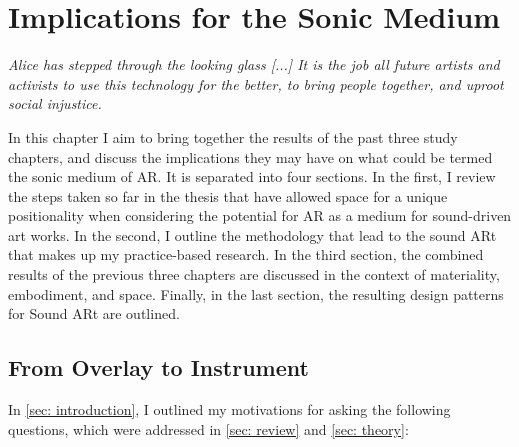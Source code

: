 \chapter{Implications for the Sonic Medium}
\label{sec: discussion}
\epigraph{\emph{Alice has stepped through the looking glass [...] It is the job all future artists and activists to use this technology for the better, to bring people together, and uproot social injustice.}}{\citep[]{skwarek2018}}
In this chapter I aim to bring together the results of the past three study chapters, and discuss the implications they may have on what could be termed the sonic medium of AR. It is separated into four sections. In the first, I review the steps taken so far in the thesis that have allowed space for a unique positionality when considering the potential for AR as a medium for sound-driven art works. In the second, I outline the methodology that lead to the sound ARt that makes up my practice-based research. In the third section, the combined results of the previous three chapters are discussed in the context of materiality, embodiment, and space. Finally, in the last section, the resulting design patterns for Sound ARt are outlined.
\section{From Overlay to Instrument} \label{sec: discussion-review}
In \autoref{sec: introduction}, I outlined my motivations for asking the following questions, which were addressed in \autoref{sec: review} and \autoref{sec: theory}: 

\begin{itemize}
    \RQgenealogy
    \RQtheory
\end{itemize}

